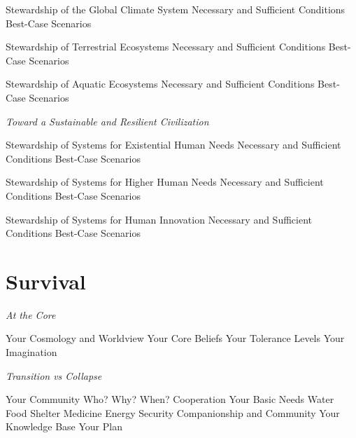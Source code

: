 \documentclass[12pt, letterpaper]{article}
\begin{document}
\begin{outline}[enumerate]
\1 Stewardship of the Global Climate System
\2 Necessary and Sufficient Conditions
\2 Best-Case Scenarios

\1 Stewardship of Terrestrial Ecosystems
\2 Necessary and Sufficient Conditions
\2 Best-Case Scenarios

\1 Stewardship of Aquatic Ecosystems
\2 Necessary and Sufficient Conditions
\2 Best-Case Scenarios
\end{outline}

\large
\begin{flushleft}
\textit{Toward a Sustainable and Resilient Civilization}
\end{flushleft}

\normalsize

\begin{outline}[enumerate]
\1 Stewardship of Systems for Existential Human Needs
\2 Necessary and Sufficient Conditions
\2 Best-Case Scenarios

\1 Stewardship of Systems for Higher Human Needs
\2 Necessary and Sufficient Conditions
\2 Best-Case Scenarios

\1 Stewardship of Systems for Human Innovation
\2 Necessary and Sufficient Conditions
\2 Best-Case Scenarios
\end{outline}


\section{Survival}

\large
\begin{flushleft}
\textit{At the Core}
\end{flushleft}

\normalsize
\begin{outline}[enumerate]
\1 Your Cosmology and Worldview
\2 Your Core Beliefs
\2 Your Tolerance Levels
\2 Your Imagination
\end{outline}

\large
\begin{flushleft}
\textit{Transition vs Collapse}
\end{flushleft}

\normalsize
\begin{outline}[enumerate]
\1 Your Community
\2 Who? 
\2 Why?
\2 When?
\2 Cooperation
\1 Your Basic Needs
\2 Water
\2 Food
\2 Shelter
\2 Medicine
\2 Energy
\2 Security
\2 Companionship and Community
\1 Your Knowledge Base
\1 Your Plan


\end{outline}





\clearpage 
\renewcommand{\thepage}{}
\printbibliography
\end{document}
